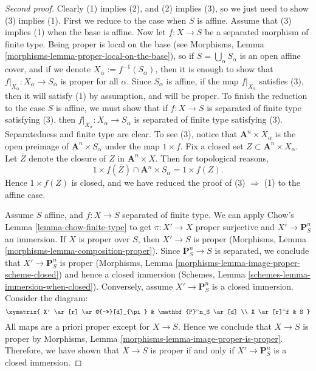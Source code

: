 \begin{proof}[Second proof]
Clearly (1) implies (2), and (2) implies (3), so we just need to show (3)
implies (1).
First we reduce to the case when $S$ is affine.  Assume that (3) implies (1)
when the base is affine.  Now let $f: X \to S$ be a separated morphism of
finite type.  Being proper is local on the base
(see Morphisms, Lemma \ref{morphisms-lemma-proper-local-on-the-base}), so if
$S = \bigcup_\alpha S_\alpha$ is an open affine cover, and if
we denote $X_\alpha := f^{-1}(S_\alpha)$, then it is
enough to show that $f|_{X_\alpha}: X_\alpha \to S_\alpha$ is proper
for all $\alpha$.  Since $S_\alpha$ is affine, if
the map $f|_{X_\alpha}$ satisfies (3), then it will satisfy (1)
by assumption, and will be proper.  To finish the reduction to the
case $S$ is affine, we must show that if $f: X \to S$ is separated of
finite type satisfying (3), then $f|_{X_\alpha} : X_\alpha \to S_\alpha$
is separated of finite type satisfying (3).  Separatedness and finite
type are clear.  To see (3), notice that
$\mathbf{A}^n \times X_\alpha$ is the open preimage of
$\mathbf{A}^n \times S_\alpha$ under the map $1 \times f$.  Fix a closed
set $Z \subset \mathbf A^n \times X_\alpha$.  Let $\bar Z$ denote the
closure of $Z$ in $\mathbf{A}^n \times X$.  Then for topological
reasons,
$$
1 \times f(\bar Z) \cap \mathbf{A}^n \times S_\alpha  = 1 \times f(Z).
$$
Hence $1 \times f(Z)$ is closed, and we have reduced the proof of
(3) $\Rightarrow$ (1) to the affine case.

\medskip\noindent
Assume $S$ affine, and $f : X \to S$ separated of finite type.
We can apply Chow's Lemma \ref{lemma-chow-finite-type}
to get $\pi : X' \to X$ proper surjective and $X' \to \mathbf{P}^n_S$
an immersion. If $X$ is proper over $S$, then $X' \to S$ is proper
(Morphisms, Lemma \ref{morphisms-lemma-composition-proper}). Since
$\mathbf{P}^n_S \to S$ is separated, we conclude that $X' \to
\mathbf{P}^n_S$ is proper
(Morphisms, Lemma \ref{morphisms-lemma-image-proper-scheme-closed})
and hence a closed immersion
(Schemes, Lemma \ref{schemes-lemma-immersion-when-closed}).
Conversely, assume $X' \to \mathbf{P}^n_S$ is a closed immersion.
Consider the diagram:
\begin{equation}
\label{equation-check-proper}
\xymatrix{
X' \ar[r] \ar@{->>}[d]_{\pi} &
\mathbf{P}^n_S \ar[d] \\
X \ar[r]^f & S
}
\end{equation}
All maps are a priori proper except for $X \to S$.
Hence we conclude that $X \to S$ is proper by
Morphisms, Lemma \ref{morphisms-lemma-image-proper-is-proper}.
Therefore, we have shown that $X \to S$ is proper if and only if
$X' \to \mathbf{P}^n_S$ is a closed immersion.


\end{proof}
